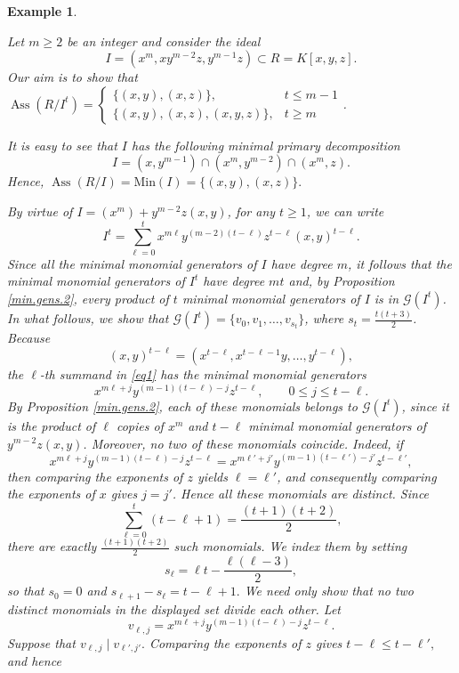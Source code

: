 \documentclass[11pt]{amsart}
\newtheorem{example}[theorem]{Example}
\def\Ass{\operatorname{Ass}}
\begin{document}
\begin{example} \label{example-for-p1}  
\em{
Let $m\geq 2$ be an integer and consider the ideal
$$I=(x^m,xy^{m-2}z,y^{m-1}z)\subset R=K[x,y,z].$$
Our aim is to show  that $\Ass(R/I^t)=\begin{cases} \{(x,y),(x,z)\},&t\leq m-1 \\ 
\{(x,y),(x,z),(x,y,z)\},&t\geq m  \end{cases}$.

It is easy to see that $I$ has the following minimal primary decomposition
 $$I = (x, y^{m-1}) \cap (x^m, y^{m-2}) \cap (x^m, z).$$
Hence, $\Ass(R/I)=\mathrm{Min}(I)=\{(x,y),(x,z)\}.$ 

By virtue of $I = (x^m)+y^{m-2}z(x,y)$,
for any $t\geq 1$, we can write  
\begin{equation}\label{eq1}
I^t = \sum_{\ell=0}^t x^{m\ell}y^{(m-2)(t-\ell)}z^{t-\ell}(x,y)^{t-\ell}.
\end{equation}
Since all the minimal monomial generators of $I$ have degree $m$, it follows that the minimal monomial
generators of $I^t$ have degree $mt$ and, by Proposition \ref{min.gens.2}, every product of $t$  minimal monomial generators of 
$I$ is in $\mathcal{G}(I^t)$.    In what follows, we show that  $\mathcal{G}(I^t)=\{v_0,v_1,\ldots,v_{s_t}\}$, where 
$s_t=\frac{t(t+3)}{2}$.  Because 
\[
(x,y)^{t-\ell}
=
(x^{t-\ell},x^{t-\ell-1}y,\ldots,y^{t-\ell}),
\]
the $\ell$-th summand in \eqref{eq1} has the minimal monomial generators
\[
x^{m\ell+j}y^{(m-1)(t-\ell)-j}z^{t-\ell},
\qquad
0\leq j\leq t-\ell.
\]
By Proposition \ref{min.gens.2}, each of these monomials belongs to
$\mathcal{G}(I^t)$, since it is the product of $\ell$ copies of $x^m$
and $t-\ell$ minimal monomial generators of $y^{m-2}z(x,y)$.
Moreover, no two of these monomials coincide. Indeed, if
\[
x^{m\ell+j}y^{(m-1)(t-\ell)-j}z^{t-\ell}
=
x^{m\ell'+j'}y^{(m-1)(t-\ell')-j'}z^{t-\ell'},
\]
then comparing the exponents of $z$ yields $\ell=\ell'$, and
consequently comparing the exponents of $x$ gives $j=j'$. Hence all
these monomials are distinct.
Since
\[
\sum_{\ell=0}^{t}(t-\ell+1)
=
\frac{(t+1)(t+2)}{2},
\]
there are exactly $\frac{(t+1)(t+2)}{2}$ such monomials. We index them
by setting
\[
s_{\ell}
=
\ell t-\frac{\ell(\ell-3)}{2},
\]
so that $s_0=0$ and  $s_{\ell+1}-s_{\ell}=t-\ell+1.$ We need only show  that no two distinct monomials in the displayed set divide each other.
Let
\[
v_{\ell,j}
=
x^{m\ell+j}y^{(m-1)(t-\ell)-j}z^{t-\ell}.
\]
Suppose that $v_{\ell,j}\mid v_{\ell',j'}.$ Comparing the exponents of $z$ gives  $t-\ell\leq t-\ell',$ and hence
}
\end{example}
\end{document}
